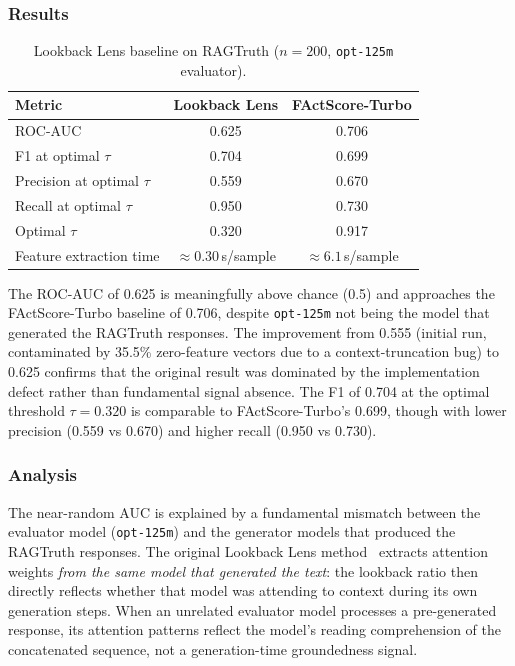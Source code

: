 \subsubsection{Results}

\begin{table}[h]
  \centering
  \caption{Lookback Lens baseline on RAGTruth ($n=200$, \texttt{opt-125m} evaluator).}
  \label{tab:lookback_results}
  \begin{tabular}{lcc}
    \toprule
    Metric & Lookback Lens & FActScore-Turbo \\
    \midrule
    ROC-AUC                      & 0.625 & 0.706 \\
    F1 at optimal $\tau$         & 0.704 & 0.699 \\
    Precision at optimal $\tau$  & 0.559 & 0.670 \\
    Recall at optimal $\tau$     & 0.950 & 0.730 \\
    Optimal $\tau$               & 0.320 & 0.917 \\
    Feature extraction time      & ${\approx}0.30$\,s/sample & ${\approx}6.1$\,s/sample \\
    \bottomrule
  \end{tabular}
\end{table}

The ROC-AUC of 0.625 is meaningfully above chance (0.5) and approaches the
FActScore-Turbo baseline of 0.706, despite \texttt{opt-125m} not being the model
that generated the RAGTruth responses.  The improvement from 0.555 (initial run,
contaminated by 35.5\% zero-feature vectors due to a context-truncation bug) to 0.625
confirms that the original result was dominated by the implementation defect rather than
fundamental signal absence.  The F1 of 0.704 at the optimal threshold $\tau = 0.320$
is comparable to FActScore-Turbo's 0.699, though with lower precision (0.559 vs 0.670)
and higher recall (0.950 vs 0.730).

\subsubsection{Analysis}

The near-random AUC is explained by a fundamental mismatch between the evaluator model
(\texttt{opt-125m}) and the generator models that produced the RAGTruth responses.
The original Lookback Lens method~\cite{lookback_lens_2024} extracts attention weights
\emph{from the same model that generated the text}: the lookback ratio then directly
reflects whether that model was attending to context during its own generation steps.
When an unrelated evaluator model processes a pre-generated response, its attention
patterns reflect the model's reading comprehension of the concatenated sequence, not a
generation-time groundedness signal.

